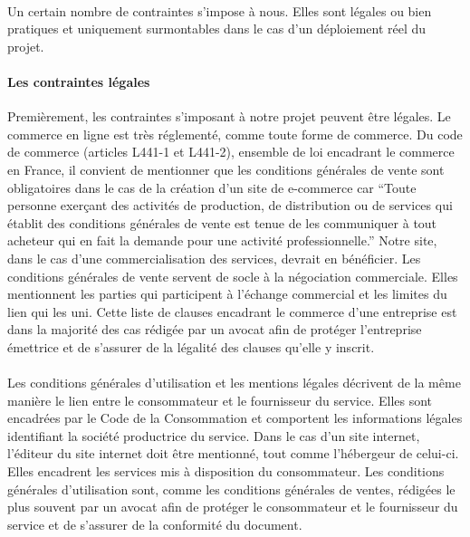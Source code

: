 \documentclass[a4paper, 12pt]{article}
\begin{document}
\paragraph{}Un certain nombre de contraintes s’impose à nous. Elles sont légales ou bien pratiques et uniquement surmontables dans le cas d’un déploiement réel du projet.
\paragraph{Les contraintes légales}Premièrement, les contraintes s’imposant à notre projet peuvent être légales. Le commerce en ligne est très réglementé, comme toute forme de commerce. Du code de commerce (articles L441-1 et L441-2), ensemble de loi encadrant le commerce en France, il convient de mentionner que les conditions générales de vente sont obligatoires dans le cas de la création d’un site de e-commerce car “Toute personne exerçant des activités de production, de distribution ou de services qui établit des conditions générales de vente est tenue de les communiquer à tout acheteur qui en fait la demande pour une activité professionnelle.”\cite{code_commerce_1} Notre site, dans le cas d’une commercialisation des services, devrait en bénéficier. Les conditions générales de vente servent de socle à la négociation commerciale.\cite{code_commerce_1} Elles mentionnent les parties qui participent à l’échange commercial et les limites du lien qui les uni. Cette liste de clauses encadrant le commerce d’une entreprise est dans la majorité des cas rédigée par un avocat afin de protéger l’entreprise émettrice et de s’assurer de la légalité des clauses qu’elle y inscrit.
\paragraph{}Les conditions générales d’utilisation et les mentions légales décrivent de la même manière le lien entre le consommateur et le fournisseur du service. Elles sont encadrées par le Code de la Consommation et comportent les informations légales identifiant la société productrice du service. \cite{code_consommation} Dans le cas d’un site internet, l’éditeur du site internet doit être mentionné, tout comme l’hébergeur de celui-ci. Elles encadrent les services mis à disposition du consommateur. Les conditions générales d’utilisation sont, comme les conditions générales de ventes, rédigées le plus souvent par un avocat afin de protéger le consommateur et le fournisseur du service et de s’assurer de la conformité du document.
\end{document}
